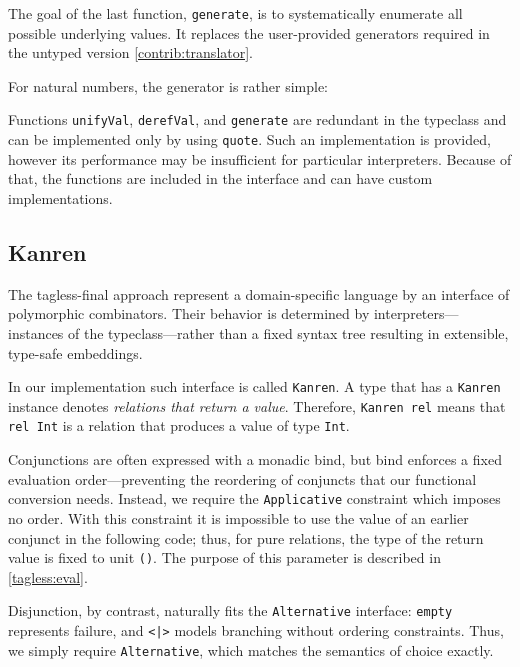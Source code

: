 The goal of the last function, \lstinline{generate}, is to systematically enumerate all possible underlying values. 
It replaces the user-provided generators required in the untyped version \ref{contrib:translator}.


For natural numbers, the generator is rather simple:


Functions \lstinline{unifyVal}, \lstinline{derefVal}, and \lstinline{generate} are redundant in the typeclass and can be implemented only by using \lstinline{quote}.
Such an implementation is provided, however its performance may be insufficient for particular interpreters. 
Because of that, the functions are included in the interface and can have custom implementations. 


\subsection{Kanren}
\label{tagless:kanren}

The tagless-final approach represent a domain-specific language by an interface of polymorphic combinators. 
Their behavior is determined by interpreters---instances of the typeclass---rather than a fixed syntax tree resulting in extensible, type-safe embeddings. 

In our implementation such interface is called \lstinline{Kanren}.
A type that has a \lstinline{Kanren} instance denotes \emph{relations that return a value}.
Therefore, \lstinline{Kanren rel} means that \lstinline{rel Int} is a relation that produces a value of type \lstinline{Int}. 

Conjunctions are often expressed with a monadic bind, but bind enforces a fixed evaluation order---preventing the reordering of conjuncts that our functional conversion needs.
Instead, we require the \lstinline{Applicative} constraint which imposes no order. 
With this constraint it is impossible to use the value of an earlier conjunct in the following code; thus, for pure \mk relations, the type of the return value is fixed to unit \lstinline{()}. 
The purpose of this parameter is described in \ref{tagless:eval}.

Disjunction, by contrast, naturally fits the \lstinline{Alternative} interface: \lstinline{empty} represents failure, and \lstinline{<|>} models branching without ordering constraints. 
Thus, we simply require \lstinline{Alternative}, which matches the semantics of \mk choice exactly.

